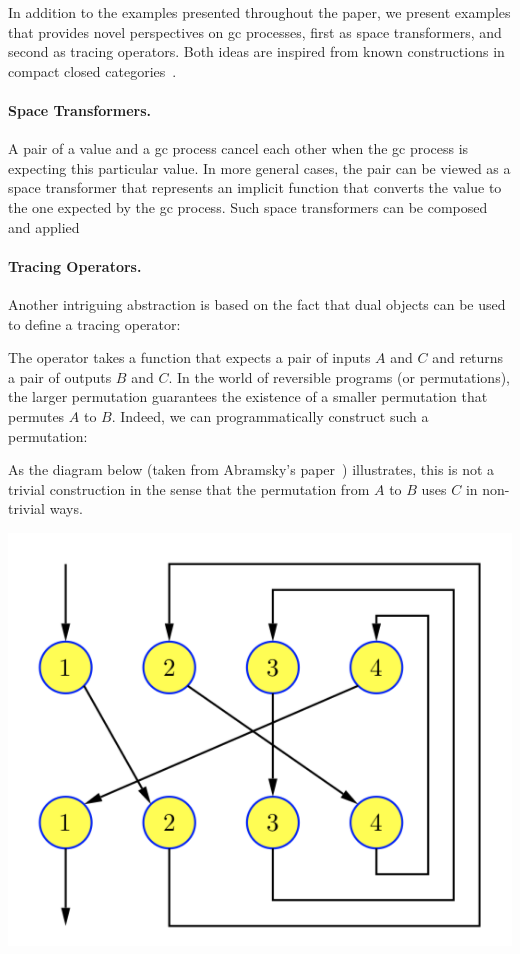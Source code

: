 \documentclass[sigplan,10pt,review,anonymous]{acmart}
\begin{document}
In addition to the examples presented throughout the paper, we present
examples that provides novel perspectives on gc processes, first as
space transformers, and second as tracing operators. Both ideas are
inspired from known constructions in compact closed
categories~\cite{dblp:conf/calco/abramsky05}.

\paragraph*{Space Transformers.} A pair of a value and a gc process
cancel each other when the gc process is expecting this particular
value. In more general cases, the pair can be viewed as a space
transformer that represents an implicit function that converts the value to the
one expected by the gc process. Such space transformers can be
composed and applied

\PPFThof{}

\paragraph*{Tracing Operators.} Another intriguing abstraction is
based on the fact that dual objects can be used to define a tracing
operator:

\PPFTtrace{}

The operator takes a function that expects a pair of inputs $A$ and
$C$ and returns a pair of outputs $B$ and $C$. In the world of
reversible programs (or permutations), the larger permutation
guarantees the existence of a smaller permutation that permutes $A$ to
$B$. Indeed, we can programmatically construct such a permutation:

As the diagram below (taken from Abramsky's
paper~\cite{dblp:conf/calco/abramsky05}) illustrates, this is not a
trivial construction in the sense that the permutation from $A$ to $B$
uses $C$ in non-trivial ways.

\includegraphics[scale=0.5]{trace.png}
\end{document}
